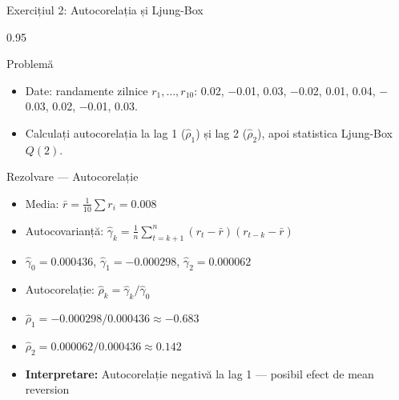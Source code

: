 \documentclass[9pt, aspectratio=169, t]{beamer}
\begin{document}
\begin{frame}{Exercițiul 2: Autocorelația și Ljung-Box}
    \begin{cminipage}{0.95\textwidth}
\begin{block}{Problemă}
\begin{itemize}\setlength{\itemsep}{0pt}
    \item Date: randamente zilnice $r_1, \ldots, r_{10}$: 0.02, $-$0.01, 0.03, $-$0.02, 0.01, 0.04, $-$0.03, 0.02, $-$0.01, 0.03.
    \item Calculați autocorelația la lag 1 ($\hat\rho_1$) și lag 2 ($\hat\rho_2$), apoi statistica Ljung-Box $Q(2)$.
\end{itemize}
\end{block}

\begin{exampleblock}{Rezolvare --- Autocorelație}
\small
\begin{itemize}\setlength{\itemsep}{0pt}
    \item Media: $\bar{r} = \frac{1}{10}\sum r_i = 0.008$
    \item Autocovarianță:
$\hat\gamma_k = \frac{1}{n}\sum_{t=k+1}^{n}(r_t - \bar{r})(r_{t-k} - \bar{r})$
    \item $\hat\gamma_0 = 0.000436$, \; $\hat\gamma_1 = -0.000298$, \; $\hat\gamma_2 = 0.000062$
    \item Autocorelație: $\hat\rho_k = \hat\gamma_k / \hat\gamma_0$
    \item $\hat\rho_1 = -0.000298 / 0.000436 \approx \mathbf{-0.683}$
    \item $\hat\rho_2 = 0.000062 / 0.000436 \approx \mathbf{0.142}$
    \item \textbf{Interpretare:} Autocorelație negativă la lag 1 --- posibil efect de mean reversion
\end{itemize}
\end{exampleblock}
    \end{cminipage}
\end{frame}
\end{document}
